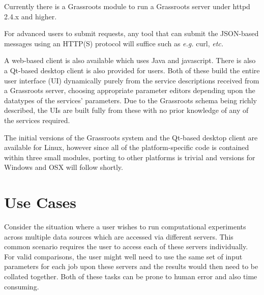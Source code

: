 \documentclass[9pt,a4paper]{extarticle}
\begin{document}
Currently there is a Grassroots module to run a Grassroots server under httpd 2.4.x and higher. 

For advanced users to submit requests, any tool that can submit the JSON-based messages using an HTTP(S) protocol will suffice such as \textit{e.g.} curl\cite{curl}, \textit{etc.} 

A web-based client is also available which uses Java\cite{Java} and javascript. 
There is also a Qt-based\cite{qt} desktop client is also provided for users. 
Both of these build the entire user interface (UI) dynamically purely from the service descriptions received from a Grassroots server, choosing appropriate parameter editors depending upon the datatypes of the services' parameters.
Due to the Grassroots schema being richly described, the UIs are built fully from these with no prior knowledge of any of the services required. 

The initial versions of the Grassroots system and the Qt-based desktop client are available for Linux, however since all of the platform-specific code is contained within three small modules, porting to other platforms is trivial and versions for Windows and OSX will follow shortly.




\section{Use Cases} 
\label{sec:usage} %

Consider the situation where a user wishes to run computational experiments across multiple data sources which are accessed via different servers. 
This common scenario requires the user to access each of these servers individually. 
For valid comparisons, the user might well need to use the same set of input parameters for each job upon these servers and the results would then need to be collated together. 
Both of these tasks can be prone to human error and also time consuming. 
\end{document}

